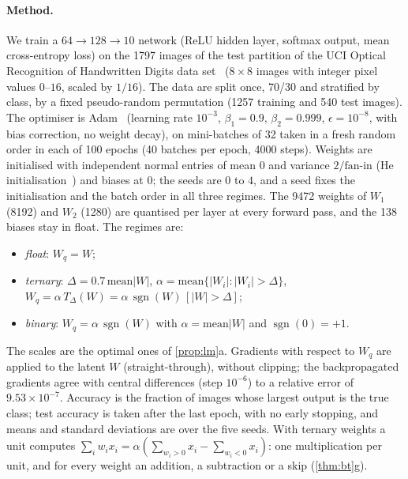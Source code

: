 \documentclass[11pt]{article}
\theoremstyle{definition}\newtheorem{definition}[theorem]{Definition}
\theoremstyle{remark}\newtheorem{remark}[theorem]{Remark}
\newcommand{\sgn}{\operatorname{sgn}}
\begin{document}
\paragraph{Method.} We train a $64\to128\to10$ network (ReLU hidden layer, softmax output, mean cross-entropy loss) on the 1797 images of the test partition of the UCI Optical Recognition of Handwritten Digits data set~\cite{uci_digits} ($8\times8$ images with integer pixel values $0$--$16$, scaled by $1/16$). The data are split once, 70/30 and stratified by class, by a fixed pseudo-random permutation (1257 training and 540 test images). The optimiser is Adam~\cite{adam} (learning rate $10^{-3}$, $\beta_1=0.9$, $\beta_2=0.999$, $\epsilon=10^{-8}$, with bias correction, no weight decay), on mini-batches of 32 taken in a fresh random order in each of 100 epochs (40 batches per epoch, 4000 steps). Weights are initialised with independent normal entries of mean $0$ and variance $2/\text{fan-in}$ (He initialisation~\cite{he2015}) and biases at $0$; the seeds are $0$ to $4$, and a seed fixes the initialisation and the batch order in all three regimes. The 9472 weights of $W_1$ (8192) and $W_2$ (1280) are quantised per layer at every forward pass, and the 138 biases stay in float. The regimes are:
\begin{itemize}[label=$\bullet$]
\item \emph{float}: $W_q=W$;
\item \emph{ternary}: $\Delta=0.7\,\mathrm{mean}|W|$, $\alpha=\mathrm{mean}\{|W_i|:|W_i|>\Delta\}$, $W_q=\alpha\,T_\Delta(W)=\alpha\,\sgn(W)\,[|W|>\Delta]$;
\item \emph{binary}: $W_q=\alpha\,\sgn(W)$ with $\alpha=\mathrm{mean}|W|$ and $\sgn(0)=+1$.
\end{itemize}
The scales are the optimal ones of \cref{prop:lm}a. Gradients with respect to $W_q$ are applied to the latent $W$ (straight-through), without clipping; the backpropagated gradients agree with central differences (step $10^{-6}$) to a relative error of $9.53\times10^{-7}$. Accuracy is the fraction of images whose largest output is the true class; test accuracy is taken after the last epoch, with no early stopping, and means and standard deviations are over the five seeds. With ternary weights a unit computes $\sum_iw_ix_i=\alpha(\sum_{w_i>0}x_i-\sum_{w_i<0}x_i)$: one multiplication per unit, and for every weight an addition, a subtraction or a skip (\cref{thm:bt}g).
\end{document}

